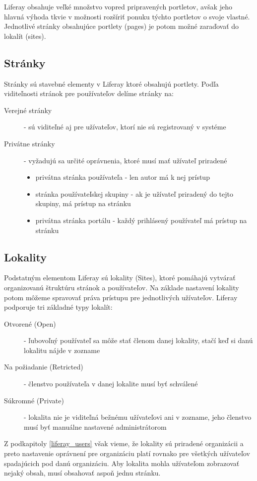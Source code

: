 \documentclass[
  digital, %
  twoside, %
  notable,   %
  nolof,   %
  nolot,   %
]{fithesis3}
\begin{document}
Liferay obsahuje veľké množstvo vopred pripravených portletov, avšak jeho hlavná výhoda tkvie v možnosti rozšíriť ponuku týchto portletov o svoje vlastné. Jednotlivé stránky obsahujúce portlety (pages) je potom možné zaraďovať do lokalít (sites).

\subsection{Stránky}
Stránky sú stavebné elementy v Liferay ktoré obsahujú portlety. Podľa viditeľnosti stránok pre používateľov delíme stránky na:
\begin{description}
\item[Verejné stránky] - sú viditeľné aj pre užívateľov, ktorí nie sú registrovaný v systéme
\item[Privátne stránky] - vyžadujú sa určité oprávnenia, ktoré musí mať užívateľ priradené
\begin{itemize}
\item privátna stránka používateľa - len autor má k nej prístup
\item stránka používateľskej skupiny - ak je užívateľ priradený do tejto skupiny, má prístup na stránku
\item privátna stránka portálu - každý prihlásený používateľ má prístup na stránku
\end{itemize}
\end{description}

\subsection{Lokality}
Podstatným elementom Liferay sú lokality (Sites), ktoré pomáhajú vytvárať organizovanú štruktúru stránok a používateľov. Na základe nastavení lokality potom môžeme spravovať práva prístupu pre jednotlivých užívateľov. Liferay podporuje tri základné typy lokalít\cite{burska2016portlety}:
\begin{description}
\item[Otvorené (Open)] - ľubovoľný používateľ sa môže stať členom danej lokality, stačí keď si danú lokalitu nájde v zozname
\item[Na požiadanie (Retricted)] - členstvo používateľa v danej lokalite musí byť schválené
\item[Súkromné (Private)] - lokalita nie je viditeľná bežnému užívateľovi ani v zozname, jeho členstvo musí byť manuálne nastavené administrátorom
\end{description}
Z podkapitoly \ref{liferay_users} však vieme, že lokality sú priradené organizácii a preto nastavenie oprávnení pre organizáciu platí rovnako pre všetkých užívateľov spadajúcich pod danú organizáciu. Aby lokalita mohla užívateľom zobrazovať nejaký obsah, musí obsahovať aspoň jednu stránku.
\end{document}
